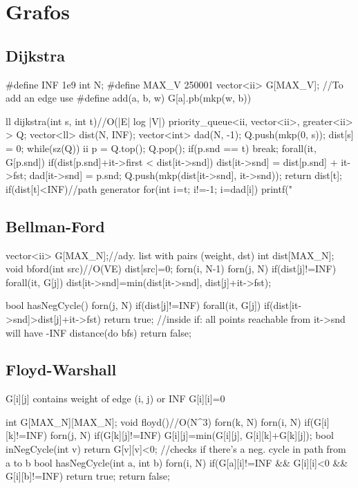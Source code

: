 \documentclass[10pt,landscape,twocolumn,a4paper,notitlepage]{article}
\begin{document}
\section{Grafos}
\subsection{Dijkstra}
\begin{code}
#define INF 1e9
int N;
#define MAX_V 250001
vector<ii> G[MAX_V];
//To add an edge use
#define add(a, b, w) G[a].pb(mkp(w, b))

ll dijkstra(int s, int t){//O(|E| log |V|)
	priority_queue<ii, vector<ii>, greater<ii> > Q;
	vector<ll> dist(N, INF); vector<int> dad(N, -1);
	Q.push(mkp(0, s)); dist[s] = 0;
	while(sz(Q)){
		ii p = Q.top(); Q.pop();
		if(p.snd == t) break;
		forall(it, G[p.snd])
			if(dist[p.snd]+it->first < dist[it->snd]){
				dist[it->snd] = dist[p.snd] + it->fst;
				dad[it->snd] = p.snd;
				Q.push(mkp(dist[it->snd], it->snd));
			}
	}
	return dist[t];
	if(dist[t]<INF)//path generator
		for(int i=t; i!=-1; i=dad[i])
			printf("%
}
\end{code}
\subsection{Bellman-Ford}
\begin{code}
vector<ii> G[MAX_N];//ady. list with pairs (weight, dst)
int dist[MAX_N];
void bford(int src){//O(VE)
	dist[src]=0;
	forn(i, N-1) forn(j, N) if(dist[j]!=INF) forall(it, G[j])
		dist[it->snd]=min(dist[it->snd], dist[j]+it->fst);
}

bool hasNegCycle(){
	forn(j, N) if(dist[j]!=INF) forall(it, G[j])
		if(dist[it->snd]>dist[j]+it->fst) return true;
	//inside if: all points reachable from it->snd will have -INF distance(do bfs)
	return false;
}
\end{code}
\subsection{Floyd-Warshall}
G[i][j] contains weight of edge (i, j) or INF
G[i][i]=0
\begin{code}
int G[MAX_N][MAX_N];
void floyd(){//O(N^3)
forn(k, N) forn(i, N) if(G[i][k]!=INF) forn(j, N) if(G[k][j]!=INF)
	G[i][j]=min(G[i][j], G[i][k]+G[k][j]);
}
bool inNegCycle(int v){
	return G[v][v]<0;}
//checks if there's a neg. cycle in path from a to b
bool hasNegCycle(int a, int b){
	forn(i, N) if(G[a][i]!=INF && G[i][i]<0 && G[i][b]!=INF)
		return true;
	return false;
}
\end{code}
\end{document}
